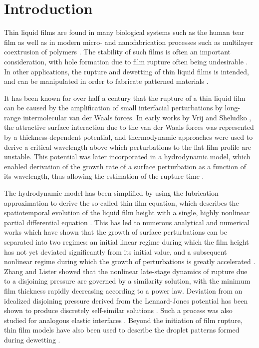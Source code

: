 \documentclass[
 onecolumn,
 amsmath,amssymb,
floatfix,superscriptaddress
]{revtex4-2}
\begin{document}
\section{\label{sec:level1}Introduction}
Thin liquid films are found in many biological systems such as the human tear film \cite{WongFattRadke1996,SujaMossigeFuller2022} as well as in modern micro- and nanofabrication processes such as multilayer coextrusion of polymers \cite{LiBaer2020,BironeauSollogoub2017}. The stability of such films is often an important consideration, with hole formation due to film rupture often being undesirable \cite{BironeauSollogoub2017,craster2009}. In other applications, the rupture and dewetting of thin liquid films is intended, and can be manipulated in order to fabricate patterned materials \cite{FerrellHansford2007,DharaMukherjee2018}. 

It has been known for over half a century that the rupture of a thin liquid film can be caused by the amplification of small interfacial perturbations by long-range intermolecular van der Waals forces. In early works by Vrij \cite{Vrij1966} and Sheludko \cite{SHELUDKO1967}, the attractive surface interaction due to the van der Waals forces was represented by a thickness-dependent potential, and thermodynamic approaches were used to derive a critical wavelength above which perturbations to the flat film profile are unstable. This potential was later incorporated in a hydrodynamic model, which enabled derivation of the growth rate of a surface perturbation as a function of its wavelength, thus allowing the estimation of the rupture time \cite{RuckensteinJain1974}. 

The hydrodynamic model has been simplified by using the lubrication approximation to derive the so-called thin film equation, which describes the spatiotemporal evolution of the liquid film height with a single, highly nonlinear partial differential equation \cite{WilliamsDavis1982,OronBankoff1997}. This has led to numerous analytical and numerical works which have shown that the growth of surface perturbations can be separated into two regimes: an initial linear regime during which the film height has not yet deviated significantly from its initial value, and a subsequent nonlinear regime during which the growth of perturbations is greatly accelerated \cite{WilliamsDavis1982,SharmaRuck1986}. Zhang and Lister \cite{ZhangLister1999} showed that the nonlinear late-stage dynamics of rupture due to a disjoining pressure are governed by a similarity solution, with the minimum film thickness rapidly decreasing according to a power law. Deviation from an idealized disjoining pressure derived from the Lennard-Jones potential has been shown to produce discretely self-similar solutions  \cite{DallastonKalliadasis2018}. Such a process was also studied for analogous elastic interfaces \cite{carlson2015physfluids}. Beyond the initiation of film rupture, thin film models have also been used to  describe the droplet patterns formed during dewetting \cite{BeckerJacobsMecke2003}.
\end{document}
